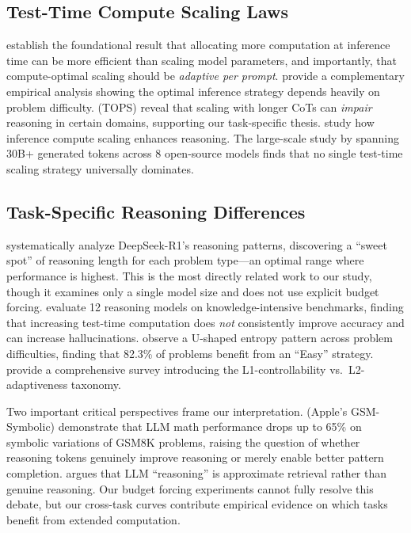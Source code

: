 \documentclass[11pt]{article}
\begin{document}
\subsection{Test-Time Compute Scaling Laws}

\citet{snell2024scaling} establish the foundational result that allocating more computation at inference time can be more efficient than scaling model parameters, and importantly, that compute-optimal scaling should be \emph{adaptive per prompt}. \citet{bansal2024empirical} provide a complementary empirical analysis showing the optimal inference strategy depends heavily on problem difficulty. \citet{yang2025tops} (TOPS) reveal that scaling with longer CoTs can \emph{impair} reasoning in certain domains, supporting our task-specific thesis. \citet{yeo2025demystifying} study how inference compute scaling enhances reasoning. The large-scale study by \citet{artofscaling2025} spanning 30B+ generated tokens across 8 open-source models finds that no single test-time scaling strategy universally dominates.

\subsection{Task-Specific Reasoning Differences}

\citet{marjanovic2025thoughtology} systematically analyze DeepSeek-R1's reasoning patterns, discovering a ``sweet spot'' of reasoning length for each problem type---an optimal range where performance is highest. This is the most directly related work to our study, though it examines only a single model size and does not use explicit budget forcing. \citet{zhao2025knowledge} evaluate 12 reasoning models on knowledge-intensive benchmarks, finding that increasing test-time computation does \emph{not} consistently improve accuracy and can increase hallucinations. \citet{liu2025diffadapt} observe a U-shaped entropy pattern across problem difficulties, finding that 82.3\% of problems benefit from an ``Easy'' strategy. \citet{alomrani2025reasoning} provide a comprehensive survey introducing the L1-controllability vs.\ L2-adaptiveness taxonomy.

Two important critical perspectives frame our interpretation. \citet{mirzadeh2024gsmsymbolic} (Apple's GSM-Symbolic) demonstrate that LLM math performance drops up to 65\% on symbolic variations of GSM8K problems, raising the question of whether reasoning tokens genuinely improve reasoning or merely enable better pattern completion. \citet{kambhampati2024reason} argues that LLM ``reasoning'' is approximate retrieval rather than genuine reasoning. Our budget forcing experiments cannot fully resolve this debate, but our cross-task curves contribute empirical evidence on which tasks benefit from extended computation.
\end{document}
